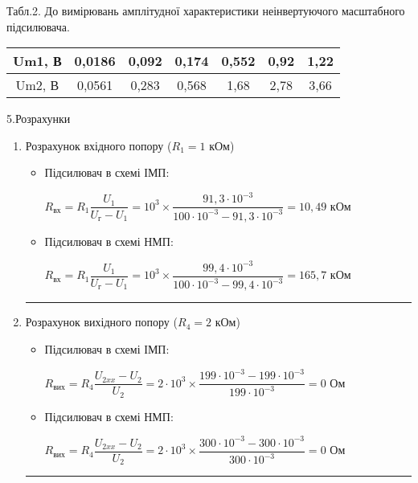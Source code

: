 \documentclass[14pt,a4paper]{scrartcl}
\begin{document}
\begin{center}
Табл.2. До вимірювань амплітудної характеристики неінвертуючого масштабного підсилювача.\\[0.5cm]
\begin{tabular}{|c|c|c|c|c|c|c|}
\hline
Um1, В & 0,0186 & 0,092 & 0,174 & 0,552 & 0,92 & 1,22 \\ \hline
Um2, В & 0,0561 & 0,283 & 0,568 & 1,68  & 2,78 & 3,66 \\ \hline
\end{tabular}
\end{center}
\newpage

\begin{center}
{\Large 5.Розрахунки}
\end{center}
\begin{enumerate}
\item Розрахунок вхідного попору ($R_1=1$ кОм)

\begin{itemize}
\item Підсилювач в схемі ІМП:
\begin{center}
$R_{\text{вх}}=R_1\dfrac{U_1}{U_{\text{г}}-U_1}=10^3\times{\dfrac{91,3\cdot{10^{-3}}}{100\cdot{10^{-3}}-91,3\cdot{10^{-3}}}}=10,49$ кОм\\[1cm]
\end{center}

\item Підсилювач в схемі НМП:
\begin{center}
$R_{\text{вх}}=R_1\dfrac{U_1}{U_{\text{г}}-U_1}=10^3\times{\dfrac{99,4\cdot{10^{-3}}}{100\cdot{10^{-3}}-99,4\cdot{10^{-3}}}}=165,7$ кОм
\end{center}
\end{itemize}
\medskip\hrule\medskip

\item Розрахунок вихідного попору ($R_4=2$ кОм)

\begin{itemize}
\item Підсилювач в схемі ІМП:
\begin{center}
$R_{\text{вих}}=R_4\dfrac{U_{2xx}-U_2}{U_2}=2\cdot{10^3} \times{\dfrac{199\cdot{10^{-3}}-199\cdot{10^{-3}}}{199\cdot{10^{-3}}}}=0$ Ом\\[1cm]
\end{center}

\item Підсилювач в схемі НМП:
\begin{center}
$R_{\text{вих}}=R_4\dfrac{U_{2xx}-U_2}{U_2}=2\cdot{10^3} \times{\dfrac{300\cdot{10^{-3}}-300\cdot{10^{-3}}}{300\cdot{10^{-3}}}}=0$ Ом
\end{center}
\end{itemize}
\medskip\hrule\medskip


\end{enumerate}
\end{document}

